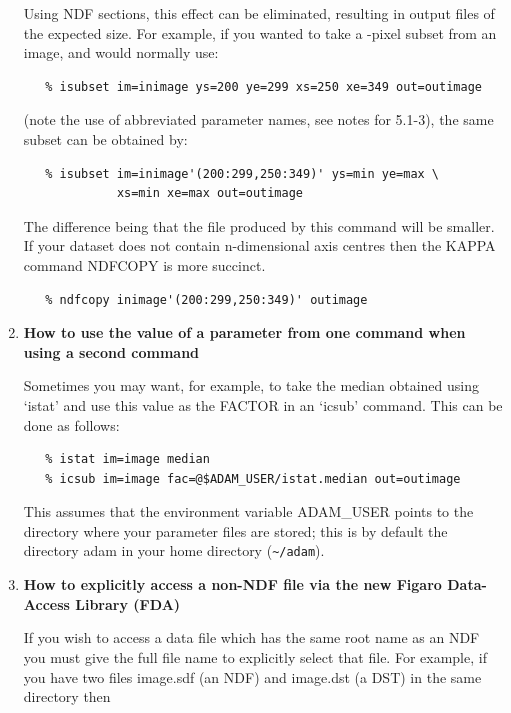 \begin{enumerate}
      Using NDF sections, this effect can be eliminated, resulting in
      output files of the expected size.  For example, if you wanted to
      take a -pixel subset from an image,
      and would normally use:

\begin{verbatim}
   % isubset im=inimage ys=200 ye=299 xs=250 xe=349 out=outimage
\end{verbatim}

      (note the use of abbreviated parameter names, see notes for 5.1-3),
      the same subset can be obtained by:

\begin{verbatim}
   % isubset im=inimage'(200:299,250:349)' ys=min ye=max \
             xs=min xe=max out=outimage
\end{verbatim}

      The difference being that the file produced by this command will
      be smaller.  If your dataset does not contain n-dimensional
      axis centres then the KAPPA command NDFCOPY is more succinct.

\begin{verbatim}
   % ndfcopy inimage'(200:299,250:349)' outimage
\end{verbatim}

\item {\bf How to use the value of a parameter from one command when using
      a second command}

      Sometimes you may want, for example, to take the median obtained
      using `istat' and use this value as the FACTOR in an `icsub' command.
      This can be done as follows:

\begin{verbatim}
   % istat im=image median
   % icsub im=image fac=@$ADAM_USER/istat.median out=outimage
\end{verbatim}

      This assumes that the environment variable ADAM\_USER points to the
      directory where your parameter files are stored; this is by default
      the directory adam in your home directory (\verb+~/adam+).

\item {\bf How to explicitly access a non-NDF file via the new Figaro
      Data-Access Library (FDA)}

      If you wish to access a data file which has the same root name as
      an NDF you must give the full file name to explicitly select that
      file.  For example, if you have two files image.sdf (an NDF) and
      image.dst (a DST) in the same directory then


\end{enumerate}
